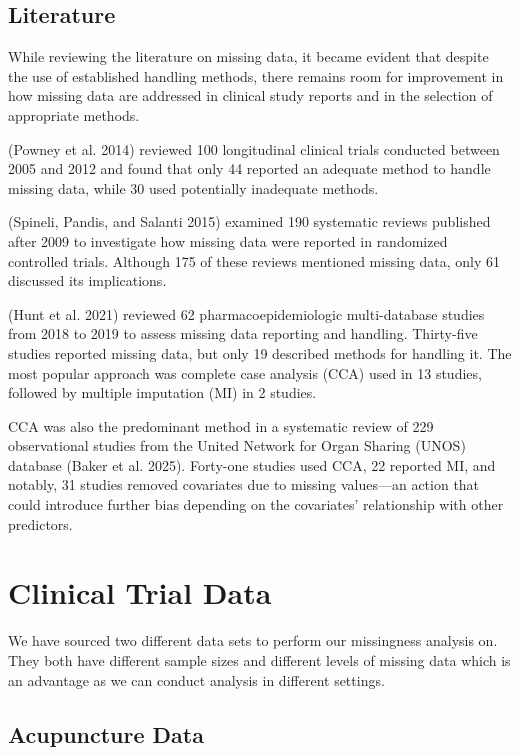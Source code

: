 \documentclass{article}
\begin{document}
\subsection{Literature}\label{literature}

While reviewing the literature on missing data, it became evident that
despite the use of established handling methods, there remains room for
improvement in how missing data are addressed in clinical study reports
and in the selection of appropriate methods.

(Powney et al. 2014) reviewed 100 longitudinal clinical trials conducted
between 2005 and 2012 and found that only 44 reported an adequate method
to handle missing data, while 30 used potentially inadequate methods.

(Spineli, Pandis, and Salanti 2015) examined 190 systematic reviews
published after 2009 to investigate how missing data were reported in
randomized controlled trials. Although 175 of these reviews mentioned
missing data, only 61 discussed its implications.

(Hunt et al. 2021) reviewed 62 pharmacoepidemiologic multi-database
studies from 2018 to 2019 to assess missing data reporting and handling.
Thirty-five studies reported missing data, but only 19 described methods
for handling it. The most popular approach was complete case analysis
(CCA) used in 13 studies, followed by multiple imputation (MI) in 2
studies.

CCA was also the predominant method in a systematic review of 229
observational studies from the United Network for Organ Sharing (UNOS)
database (Baker et al. 2025). Forty-one studies used CCA, 22 reported
MI, and notably, 31 studies removed covariates due to missing
values---an action that could introduce further bias depending on the
covariates' relationship with other predictors.

\section{Clinical Trial Data}\label{clinical-trial-data}

We have sourced two different data sets to perform our missingness
analysis on. They both have different sample sizes and different levels
of missing data which is an advantage as we can conduct analysis in
different settings.

\subsection{Acupuncture Data}\label{acupuncture-data}
\end{document}
